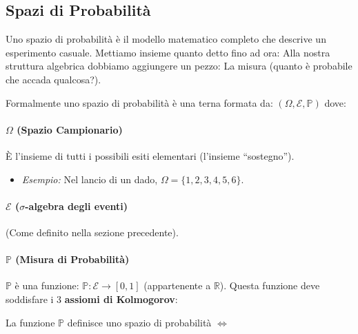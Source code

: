 \subsection{Spazi di Probabilità}
Uno spazio di probabilità è il modello matematico completo che descrive un esperimento casuale.
Mettiamo insieme quanto detto fino ad ora:
Alla nostra struttura algebrica dobbiamo aggiungere un pezzo: La misura (quanto è probabile che accada qualcosa?).

Formalmente uno spazio di probabilità è una terna formata da: $(\Omega, \mathcal{E}, \mathbb{P})$
dove:

\paragraph{$\Omega$ (Spazio Campionario)}
È l'insieme di tutti i possibili esiti elementari (l'insieme ``sostegno'').
\begin{itemize}
    \item \textit{Esempio:} Nel lancio di un dado, $\Omega=\{1, 2, 3, 4, 5, 6\}$.
\end{itemize}

\paragraph{$\mathcal{E}$ ($\sigma$-algebra degli eventi)}
(Come definito nella sezione precedente).

\paragraph{$\mathbb{P}$ (Misura di Probabilità)}
$\mathbb{P}$ è una funzione: $\mathbb{P}: \mathcal{E} \to [0,1]$ (appartenente a $\mathbb{R}$).
Questa funzione deve soddisfare i 3 \textbf{assiomi di Kolmogorov}:

La funzione $\mathbb{P}$ definisce uno spazio di probabilità $\iff$

